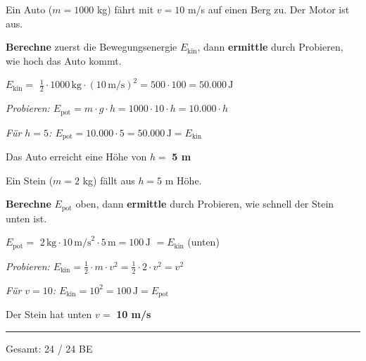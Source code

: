 \documentclass[11pt, a4paper]{article}
\newcommand{\maxpunkte}{24}
\newcommand{\lsg}[1]{\textcolor{loesung}{\textbf{#1}}}
\newcommand{\operator}[1]{\textbf{\textcolor{fachfarbe}{#1}}}
\begin{document}
\begin{teil}
\item Ein Auto ($m = 1000$ kg) fährt mit $v = 10$ m/s auf einen Berg zu. Der Motor ist aus.

\operator{Berechne} zuerst die Bewegungsenergie $E_\text{kin}$, dann \operator{ermittle} durch Probieren, wie hoch das Auto kommt.

\vspace{0.3em}
$E_\text{kin} = $ \lsg{$\frac{1}{2} \cdot 1000\,\text{kg} \cdot (10\,\text{m/s})^2 = 500 \cdot 100 = 50.000\,\text{J}$}

\vspace{0.5em}
\textit{Probieren: $E_\text{pot} = m \cdot g \cdot h = 1000 \cdot 10 \cdot h = 10.000 \cdot h$}

\textit{Für $h = 5$: $E_\text{pot} = 10.000 \cdot 5 = 50.000\,\text{J} = E_\text{kin}$ \checkmark}

\vspace{0.3em}
Das Auto erreicht eine Höhe von $h = $ \lsg{5 m}

\vspace{0.8em}

\item Ein Stein ($m = 2$ kg) fällt aus $h = 5$ m Höhe.

\operator{Berechne} $E_\text{pot}$ oben, dann \operator{ermittle} durch Probieren, wie schnell der Stein unten ist.

\vspace{0.3em}
$E_\text{pot} = $ \lsg{$2\,\text{kg} \cdot 10\,\text{m/s}^2 \cdot 5\,\text{m} = 100\,\text{J}$} $= E_\text{kin}$ (unten)

\vspace{0.5em}
\textit{Probieren: $E_\text{kin} = \frac{1}{2} \cdot m \cdot v^2 = \frac{1}{2} \cdot 2 \cdot v^2 = v^2$}

\textit{Für $v = 10$: $E_\text{kin} = 10^2 = 100\,\text{J} = E_\text{pot}$ \checkmark}

\vspace{0.3em}
Der Stein hat unten $v = $ \lsg{10 m/s}
\end{teil}

\vspace{1em}


\vfill
\hrule
\vspace{0.3em}
\begin{center}
\small\textcolor{mittelgrau}{Gesamt: \maxpunkte{} / \maxpunkte{} BE}
\end{center}
\end{document}
